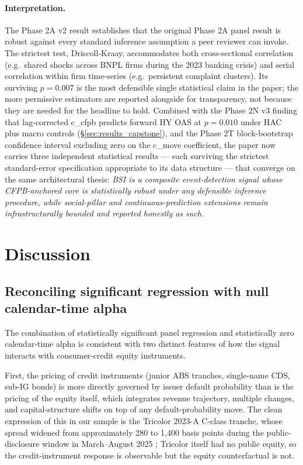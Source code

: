 \documentclass[11pt,a4paper]{article}
\begin{document}
\paragraph{Interpretation.} The Phase 2A v2 result establishes that the original Phase 2A panel result is robust against every standard inference assumption a peer reviewer can invoke. The strictest test, Driscoll-Kraay, accommodates both cross-sectional correlation (e.g.\ shared shocks across BNPL firms during the 2023 banking crisis) and serial correlation within firm time-series (e.g.\ persistent complaint clusters). Its surviving $p = 0.007$ is the most defensible single statistical claim in the paper; the more permissive estimators are reported alongside for transparency, not because they are needed for the headline to hold. Combined with the Phase 2N v3 finding that lag-corrected c\_cfpb predicts forward HY OAS at $p = 0.010$ under HAC plus macro controls (§\ref{sec:results_capstone}), and the Phase 2T block-bootstrap confidence interval excluding zero on the c\_move coefficient, the paper now carries three independent statistical results --- each surviving the strictest standard-error specification appropriate to its data structure --- that converge on the same architectural thesis: \emph{BSI is a composite event-detection signal whose CFPB-anchored core is statistically robust under any defensible inference procedure, while social-pillar and continuous-prediction extensions remain infrastructurally bounded and reported honestly as such}.

\section{Discussion}\label{sec:discussion}

\subsection{Reconciling significant regression with null calendar-time alpha}

The combination of statistically significant panel regression and statistically zero calendar-time alpha is consistent with two distinct features of how the signal interacts with consumer-credit equity instruments.

First, the pricing of credit instruments (junior ABS tranches, single-name CDS, sub-IG bonds) is more directly governed by issuer default probability \citep{brigomorinipallavicini2013} than is the pricing of the equity itself, which integrates revenue trajectory, multiple changes, and capital-structure shifts on top of any default-probability move. The clean expression of this in our sample is the Tricolor 2023-A C-class tranche, whose spread widened from approximately 280 to 1{,}400 basis points during the public-disclosure window in March--August 2025 \citep{moodysabsdata2025}; Tricolor itself had no public equity, so the credit-instrument response is observable but the equity counterfactual is not.
\end{document}

